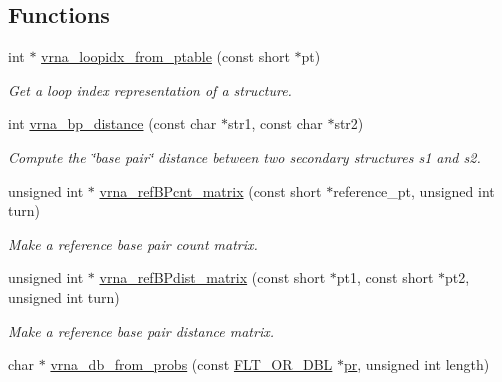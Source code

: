 \subsection*{Functions}
\begin{DoxyCompactItemize}
\item 
\mbox{\label{group__struct__utils_ga03e15af299be0866ff21da880c74b92e}} 
int $\ast$ \mbox{\hyperlink{group__struct__utils_ga03e15af299be0866ff21da880c74b92e}{vrna\+\_\+loopidx\+\_\+from\+\_\+ptable}} (const short $\ast$pt)
\begin{DoxyCompactList}\small\item\em Get a loop index representation of a structure. \end{DoxyCompactList}\item 
int \mbox{\hyperlink{group__struct__utils_ga65bdfbac6a16bf30286e8a3f7d15f60a}{vrna\+\_\+bp\+\_\+distance}} (const char $\ast$str1, const char $\ast$str2)
\begin{DoxyCompactList}\small\item\em Compute the \char`\"{}base pair\char`\"{} distance between two secondary structures s1 and s2. \end{DoxyCompactList}\item 
unsigned int $\ast$ \mbox{\hyperlink{group__struct__utils_gab4c2a00c99ce1d612ffa5bde114eb96d}{vrna\+\_\+ref\+B\+Pcnt\+\_\+matrix}} (const short $\ast$reference\+\_\+pt, unsigned int turn)
\begin{DoxyCompactList}\small\item\em Make a reference base pair count matrix. \end{DoxyCompactList}\item 
unsigned int $\ast$ \mbox{\hyperlink{group__struct__utils_ga5a27bd058183170afd4716f5b8ff511a}{vrna\+\_\+ref\+B\+Pdist\+\_\+matrix}} (const short $\ast$pt1, const short $\ast$pt2, unsigned int turn)
\begin{DoxyCompactList}\small\item\em Make a reference base pair distance matrix. \end{DoxyCompactList}\item 
\mbox{\label{group__struct__utils_ga0c28c410a5ab22d6ab9c77a84e8d5b44}} 
char $\ast$ \mbox{\hyperlink{group__struct__utils_ga0c28c410a5ab22d6ab9c77a84e8d5b44}{vrna\+\_\+db\+\_\+from\+\_\+probs}} (const \mbox{\hyperlink{group__data__structures_ga31125aeace516926bf7f251f759b6126}{F\+L\+T\+\_\+\+O\+R\+\_\+\+D\+BL}} $\ast$\mbox{\hyperlink{fold__vars_8h_ac98ec419070aee6831b44e5c700f090f}{pr}}, unsigned int length)

\end{DoxyCompactItemize}
